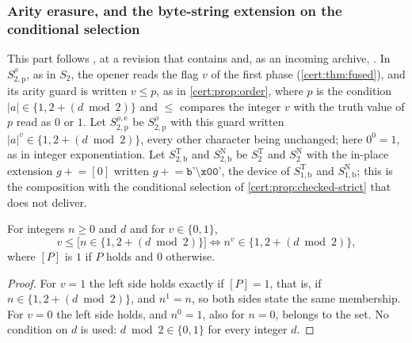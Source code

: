 \subsubsection*{Arity erasure, and the byte-string extension on the conditional selection}

This part follows , at a revision that contains
 and, as an incoming archive, .
In $S^{\rho}_{2,\mathrm p}$, as in $S_2$, the opener reads the flag $v$ of the first
phase (\cref{cert:thm:fused}), and its arity guard is written $v\le p$, as in
\cref{cert:prop:order}, where $p$ is the condition
$\lvert a\rvert\in\{1,2+(d\bmod 2)\}$ and $\le$ compares the integer $v$ with the
truth value of $p$ read as $0$ or $1$. Let $S^{\rho,\mathrm e}_{2,\mathrm p}$ be
$S^{\rho}_{2,\mathrm p}$ with this guard written
$\lvert a\rvert^{v}\in\{1,2+(d\bmod 2)\}$, every other character being unchanged;
here $0^{0}=1$, as in integer exponentiation. Let $S^{\mathrm T}_{2,\mathrm b}$ and
$S^{\mathrm N}_{2,\mathrm b}$ be $S^{\mathrm T}_2$ and $S^{\mathrm N}_2$ with the
in-place extension $g\mathrel{+}=[0]$ written
$g\mathrel{+}=\texttt{b'\textbackslash x00'}$, the device of
$S^{\mathrm T}_{1,\mathrm b}$ and $S^{\mathrm N}_{1,\mathrm b}$; this is the
composition with the conditional selection of \cref{cert:prop:checked-strict} that
 does not deliver.

\begin{lemma}\label{cert:lem:arity-erasure}
For integers $n\ge 0$ and $d$ and for $v\in\{0,1\}$,
\[
v\le\bigl[n\in\{1,2+(d\bmod 2)\}\bigr]
\iff
n^{v}\in\{1,2+(d\bmod 2)\},
\]
where $[P]$ is $1$ if $P$ holds and $0$ otherwise.
\end{lemma}
\begin{proof}
For $v=1$ the left side holds exactly if $[P]=1$, that is, if
$n\in\{1,2+(d\bmod 2)\}$, and $n^{1}=n$, so both sides state the same membership.
For $v=0$ the left side holds, and $n^{0}=1$, also for $n=0$, belongs to the set.
No condition on $d$ is used: $d\bmod 2\in\{0,1\}$ for every integer $d$.
\end{proof}

